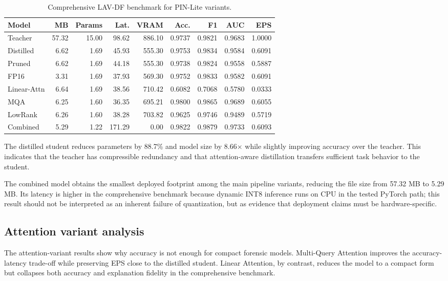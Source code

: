 \documentclass[pdflatex,sn-basic,Numbered]{sn-jnl}
\begin{document}
\begin{table}[t]
\caption{Comprehensive LAV-DF benchmark for PIN-Lite variants.}\label{tab:main-results}
\centering
\tiny
\setlength{\tabcolsep}{2pt}
\begin{tabular}{lrrrrrrrr}
\toprule
Model & MB & Params & Lat. & VRAM & Acc. & F1 & AUC & EPS \\
\midrule
Teacher & 57.32 & 15.00 & 98.62 & 886.10 & 0.9737 & 0.9821 & 0.9683 & 1.0000 \\
Distilled & 6.62 & 1.69 & 45.93 & 555.30 & 0.9753 & 0.9834 & 0.9584 & 0.6091 \\
Pruned & 6.62 & 1.69 & 44.18 & 555.30 & 0.9738 & 0.9824 & 0.9558 & 0.5887 \\
FP16 & 3.31 & 1.69 & 37.93 & 569.30 & 0.9752 & 0.9833 & 0.9582 & 0.6091 \\
Linear-Attn & 6.64 & 1.69 & 38.56 & 710.42 & 0.6082 & 0.7068 & 0.5780 & 0.0333 \\
MQA & 6.25 & 1.60 & 36.35 & 695.21 & 0.9800 & 0.9865 & 0.9689 & 0.6055 \\
LowRank & 6.26 & 1.60 & 38.28 & 703.82 & 0.9625 & 0.9746 & 0.9489 & 0.5719 \\
Combined & 5.29 & 1.22 & 171.29 & 0.00 & 0.9822 & 0.9879 & 0.9733 & 0.6093 \\
\bottomrule
\end{tabular}
\end{table}

The distilled student reduces parameters by 88.7\% and model size by 8.66$\times$ while slightly improving accuracy over the teacher. This indicates that the teacher has compressible redundancy and that attention-aware distillation transfers sufficient task behavior to the student.

The combined model obtains the smallest deployed footprint among the main pipeline variants, reducing the file size from 57.32 MB to 5.29 MB. Its latency is higher in the comprehensive benchmark because dynamic INT8 inference runs on CPU in the tested PyTorch path; this result should not be interpreted as an inherent failure of quantization, but as evidence that deployment claims must be hardware-specific.

\subsection{Attention variant analysis}\label{subsec:attention-results}

The attention-variant results show why accuracy is not enough for compact forensic models. Multi-Query Attention improves the accuracy-latency trade-off while preserving EPS close to the distilled student. Linear Attention, by contrast, reduces the model to a compact form but collapses both accuracy and explanation fidelity in the comprehensive benchmark.
\end{document}
